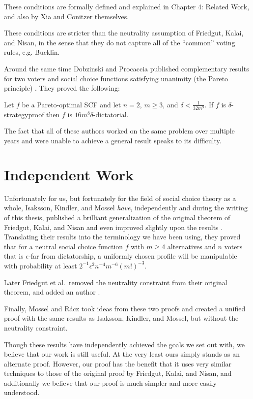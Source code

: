 	These conditions are formally defined and explained in Chapter 4: Related Work, and also by Xia and Conitzer themselves.

	These conditions are stricter than the neutrality assumption of Friedgut, Kalai, and Nisan, in the sense that they do not capture all of the ``common'' voting rules, e.g. Bucklin.

	Around the same time Dobzinski and Procaccia published complementary results for two voters and social choice functions satisfying unanimity (the Pareto principle) \cite{dobzinski2008frequent}. They proved the following:

	\begin{theorem}
		Let $f$ be a Pareto-optimal SCF and let $n = 2$, $m \ge 3$, and $\delta < \frac{1}{32m^9}$. If $f$ is $\delta$-strategyproof then $f$ is $16m^8 \delta$-dictatorial.
	\end{theorem}

	The fact that all of these authors worked on the same problem over multiple years and were unable to achieve a general result speaks to its difficulty.


\section{Independent Work}

	Unfortunately for us, but fortunately for the field of social choice theory as a whole, Isaksson, Kindler, and Mossel \emph{have}, independently and during the writing of this thesis, published a brilliant generalization of the original theorem of Friedgut, Kalai, and Nisan and even improved slightly upon the results \cite{isaksson2010geometry}. Translating their results into the terminology we have been using, they proved that for a neutral social choice function $f$ with $m \ge 4$ alternatives and $n$ voters that is $\epsilon$-far from dictatorship, a uniformly chosen profile will be manipulable with probability at least $2^{-1} \epsilon^2 n^{-4} m^{-6} (m!)^{-3}$.

	Later Friedgut et al.\ removed the neutrality constraint from their original theorem, and added an author \cite{friedgut2011quantitative}.

	Finally, Mossel and R\'{a}cz \cite{mossel2011quantitative} took ideas from these two proofs and created a unified proof with the same results as Isaksson, Kindler, and Mossel, but without the neutrality constraint.

	Though these results have independently achieved the goals we set out with, we believe that our work is still useful. At the very least ours simply stands as an alternate proof. However, our proof has the benefit that it uses very similar techniques to those of the original proof by Friedgut, Kalai, and Nisan, and additionally we believe that our proof is much simpler and more easily understood.


